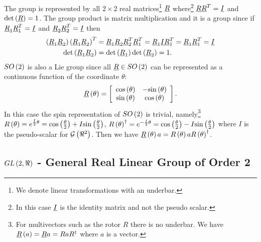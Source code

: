The group is represented by all $2\times 2$ real matrices\footnote{We denote linear transformations with an underbar.} $\underline{R}$ where\footnote{In this case $\underline{I}$ is the identity matrix and not the
pseudo scalar.} $\underline{R}\underline{R}^{T} = \underline{I}$ and $\det\left ( {\underline{R}} \right ) = 1$.  The group product is
matrix multiplication and it is a group since if $\underline{R}_{1}\underline{R}_{1}^{T} = \underline{I}$ and $\underline{R}_{2}\underline{R}_{2}^{T} = \underline{I}$ then
\begin{align}
	 \left ( {\underline{R}_{1}\underline{R}_{2}} \right )\left ( {\underline{R}_{1}\underline{R}_{2}} \right )^{T} &= \underline{R}_{1}\underline{R}_{2}\underline{R}_{2}^{T}\underline{R}_{1}^{T} = \underline{R}_{1}\underline{I}\underline{R}_{1}^{T} = \underline{R}_{1}\underline{R}_{1}^{T} = \underline{I} \\
	 {\det}\left ( {\underline{R}_{1}\underline{R}_{2}} \right ) &= {\det}\left ( {\underline{R}_{1}} \right ){\det}\left ( {\underline{R}_{2}} \right ) = 1.
\end{align}
$SO\left ( {2} \right )$ is also a Lie group since all $\underline{R}\in{SO}\left ( {2} \right )$ can be represented as a continuous function of the coordinate $\theta$:
\begin{equation}
	{\underline{R}}\left ( {\theta} \right ) = \left [ {
	\begin{array}{cc}
		{\cos}\left ( {\theta} \right ) & -{\sin}\left ( {\theta} \right ) \\
		{\sin}\left ( {\theta} \right ) & {\cos}\left ( {\theta} \right )
	\end{array}
	}\right ].
\end{equation}
In this case the spin representation of ${SO}\left ( {2} \right )$ is trivial, namely\footnote{For multivectors such as the rotor $R$ there is no 
underbar. We have ${\underline{R}}\left ( {a} \right ) = \underline{R}a = RaR^{\dagger}$ where $a$ is a vector.}
${R}\left ( {\theta} \right ) = e^{\frac{I}{2}\theta} = {\cos}\left ( {\frac{\theta}{2}} \right ) + I{\sin}\left ( {\frac{\theta}{2}} \right )$, 
${R}\left ( {\theta} \right )^{\dagger} = e^{-\frac{I}{2}\theta} = {\cos}\left ( {\frac{\theta}{2}} \right ) - I{\sin}\left ( {\frac{\theta}{2}} \right )$ where $I$
is the pseudo-scalar for ${\mathcal{G}}\left ( {\Re^{2}} \right )$. Then we have ${\underline{R}}\left ( {\theta} \right ) a = {R}\left ( {\theta} \right ) a{R}\left ( {\theta} \right )^{\dagger}$.

\subsection{${GL}\left ( {2,\Re} \right )$ - General Real Linear Group of Order 2}

